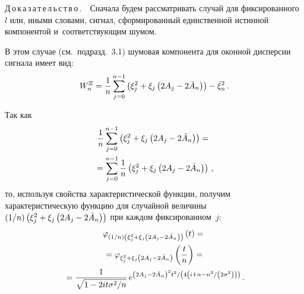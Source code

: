 \begin{multicols}{2}
\begin{enumerate}[($i$)]
\end{enumerate}

\noindent
Д\,о\,к\,а\,з\,а\,т\,е\,л\,ь\,с\,т\,в\,о\,.\ \
        Сначала будем рассматривать случай для фиксированного~$l$ или, 
        иными словами, сигнал, сформированный единственной истинной 
        компонентой и~соответствующим шумом.
    
    В этом случае (см.\ подразд.~3.1) шумовая компонента для оконной дисперсии 
    сигнала имеет вид:
    $$
    W_{n}^{\Xi}= \displaystyle\frac{\displaystyle 1\mathstrut}{\displaystyle n\mathstrut} \sum\limits_{j=0}^{n-1}\left( \xi_{j}^{2} + \xi_{j} \left( 2A_{j}-2\bar{A}_{n}\right)\right)  - \bar{\xi}_{n}^{2}\,.
$$

   \noindent
    Так как
\begin{multline*}
 \displaystyle\frac{\displaystyle 1\mathstrut}{\displaystyle n\mathstrut} \sum\limits_{j=0}^{n-1}\left( \xi_{j}^{2} + \xi_{j} \left( 2A_{j}-
 2\bar{A}_{n}\right)\right) ={}\\
 {}= \sum\limits_{j=0}^{n-1}\frac{1}{n} 
 \left( \xi_{j}^{2} + \xi_{j} \left( 2A_{j}-2\bar{A}_{n}\right)\right)\,, 
 \end{multline*}
то, используя свойства характеристической функции, получим характеристическую 
функцию для случайной величины $({1}/{n}) \left( \xi_{j}^{2} \hm+ 
\xi_{j} \left( 2A_{j}\hm-2\bar{A}_{n}\right)\right)$ при каждом фиксированном~$j$:
\begin{multline*}
\varphi_{({1}/{n}) \left( \xi_{j}^{2} + \xi_{j} \left( 2A_{j}-2\bar{A}_{n}\right)
\right) }\left( t\right)  = {}\\
{}=
\varphi_{  \xi_{j}^{2} + \xi_{j} \left( 2A_{j}-2\bar{A}_{n}\right) } 
\left( \displaystyle\frac{\displaystyle t\mathstrut}{\displaystyle n\mathstrut} \right) = {}\\
{}=
\displaystyle\frac{\displaystyle 1\mathstrut}{\displaystyle \sqrt{1-{2it\sigma^2}/{n}}\mathstrut}\,
e^{{\left( 2A_{j}-2\bar{A}_{n}\right)^{2}t^{2}}/
\left({4\left(i\,t\,n - {n^2}/\left({2\sigma^{2}}\right)\right) }\right)}\,.
\end{multline*}
    

\end{multicols}
